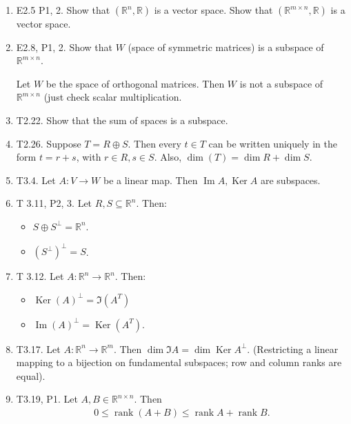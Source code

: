 \documentclass{article}
\newcommand{\RR}{\mathbb{R}}
\DeclareMathOperator{\Ker}{Ker}
\DeclareMathOperator{\Ima}{Im}
\DeclareMathOperator{\Ima}{Im}
\DeclareMathOperator{\rank}{rank}
\begin{document}
\begin{enumerate}
  \item  E2.5 P1, 2.  Show that $(\RR^n, \RR)$ is a vector space.  Show that $(\RR^{m \times n}, \RR)$ is a vector space.

  \item E2.8, P1, 2.  Show that $W$ (space of symmetric matrices) is a subspace of $\RR^{m \times n}$.

    Let $W$ be the space of orthogonal matrices.  Then $W$ is not a subspace of $\RR^{m \times n}$ (just check scalar multiplication.

    \item T2.22. Show that the sum of spaces is a subspace.

    \item T2.26. Suppose $T = R \oplus S$.  Then every $t \in T$ can be written uniquely in the form $t = r+s$, with $r \in R, s \in S$.  Also, $\dim (T) = \dim R + \dim S$.

    \item T3.4. Let $A: V \to W$ be a linear map.  Then $\Ima A, \Ker A$ are subspaces.

    \item  T 3.11, P2, 3. Let $R, S \subseteq \RR^n$.  Then:

      \begin{itemize}
        \item $S \oplus S^{\perp} = \RR^n$.
        \item $(S^{\perp})^{\perp} = S$.
      \end{itemize}

    \item T 3.12. Let $A: \RR^n \to \RR^n$.  Then:

      \begin{itemize}
        \item $\Ker(A)^{\perp} = \Im (A^T)$
        \item $\Ima (A)^{\perp} = \Ker (A^T)$.
      \end{itemize}

    \item T3.17. Let $A: \RR^n \to \RR^m$. Then $\dim \Im A = \dim \Ker A^{\perp}$. (Restricting a linear mapping to a bijection on fundamental subspaces; row and column ranks are equal).

    \item T3.19, P1. Let $A, B \in \RR^{n \times n}$.  Then
      \begin{align*}
        0 \leq \rank (A+B) \leq \rank A + \rank B.
      \end{align*}


\end{enumerate}
\end{document}

